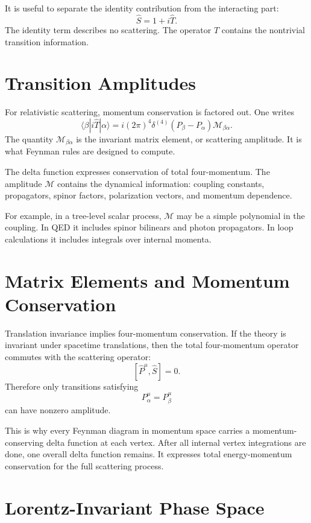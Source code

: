 It is useful to separate the identity contribution from the interacting part:
\[
    \hat S = 1+i\hat T.
\]
The identity term describes no scattering. The operator \(\hat T\) contains the
nontrivial transition information.

\section{Transition Amplitudes}

For relativistic scattering, momentum conservation is factored out. One writes
\[
    \langle\beta|i\hat T|\alpha\rangle
    = i(2\pi)^4\delta^{(4)}(P_\beta-P_\alpha)\mathcal{M}_{\beta\alpha}.
\]
The quantity \(\mathcal{M}_{\beta\alpha}\) is the invariant matrix element, or
scattering amplitude. It is what Feynman rules are designed to compute.

The delta function expresses conservation of total four-momentum. The amplitude
\(\mathcal{M}\) contains the dynamical information: coupling constants,
propagators, spinor factors, polarization vectors, and momentum dependence.

For example, in a tree-level scalar process, \(\mathcal{M}\) may be a simple
polynomial in the coupling. In QED it includes spinor bilinears and photon
propagators. In loop calculations it includes integrals over internal momenta.

\section{Matrix Elements and Momentum Conservation}

Translation invariance implies four-momentum conservation. If the theory is
invariant under spacetime translations, then the total four-momentum operator
commutes with the scattering operator:
\[
    [\hat P^\mu,\hat S]=0.
\]
Therefore only transitions satisfying
\[
    P_\alpha^\mu=P_\beta^\mu
\]
can have nonzero amplitude.

This is why every Feynman diagram in momentum space carries a momentum-conserving
delta function at each vertex. After all internal vertex integrations are done,
one overall delta function remains. It expresses total energy-momentum
conservation for the full scattering process.

\section{Lorentz-Invariant Phase Space}


